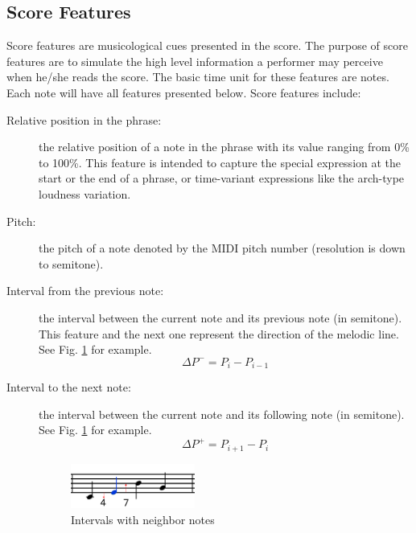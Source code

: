 \subsection{Score Features}
      Score features are musicological cues presented in the score. The purpose of score features are to simulate the high level information a performer may perceive when he/she reads the score. The basic time unit for these features are notes. Each note will have all features presented below.
      Score features include:
      \begin{description}
         \item [Relative position in the phrase:]
            the relative position of a note in the phrase with its value ranging from 0\% to 100\%. %
            This feature is intended to capture the special expression at the start or the end of a phrase, or time-variant expressions like the arch-type loudness variation.
         \item [Pitch:]
            the pitch of a note denoted by the MIDI pitch number (resolution is down to semitone). %

         \item [Interval from the previous note:] the interval between the current note and its previous note (in semitone). This feature and the next one represent the direction of the melodic line. See Fig. \ref{fig:interval} for example. $$\Delta P^- = P_{i} - P_{i-1} $$ 
         \item [Interval to the next note:] the interval between the current note and its following note (in semitone). See Fig. \ref{fig:interval} for example. $$\Delta P^+ = P_{i+1} - P_i$$ 
         
      \begin{figure}[tp]
         \begin{center}
            \includegraphics[width=0.4\textwidth]{fig/interval_arrow}
         \end{center}
         \caption{Intervals with neighbor notes}
         \label{fig:interval}
      \end{figure}


\end{description}
